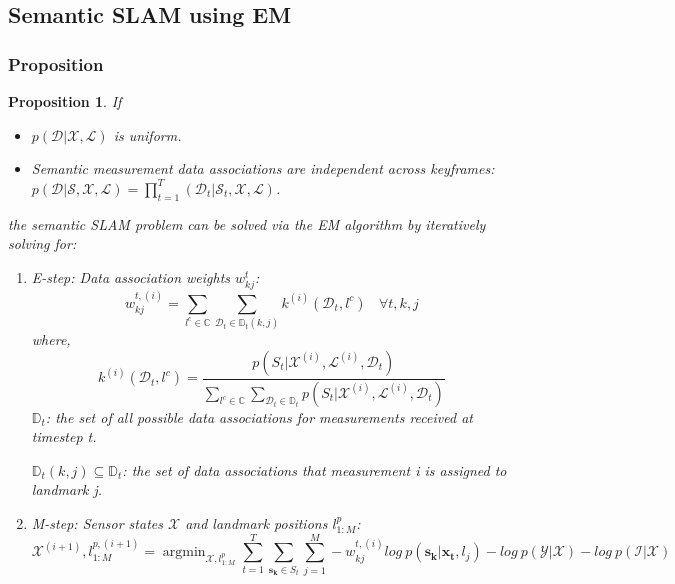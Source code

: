 \documentclass[12pt]{article}
\DeclareMathOperator*{\argmin}{argmin} %
\numberwithin{equation}{section}
\newtheorem{Proposition}{Proposition}
\begin{document}
\subsection{Semantic SLAM using EM}
\subsubsection{Proposition}
\begin{Proposition}
	If
	\begin{itemize}
		\item $p(\mathcal{D}|\mathcal{X},\mathcal{L})$ is uniform.
		\item Semantic measurement data associations are independent across keyframes: $p(\mathcal{D}|\mathcal{S},\mathcal{X},\mathcal{L})=\prod^T_{t=1}(\mathcal{D}_t|\mathcal{S}_t,\mathcal{X},\mathcal{L})$.
	\end{itemize}
	the semantic SLAM problem can be solved via the EM algorithm by iteratively solving for:
	\begin{enumerate}
		\item E-step: Data association weights $w^t_{kj}$:
		\begin{equation}
			w^{t,(i)}_{kj}=\sum_{l^c \in \mathbb{C}} \sum_{\mathcal{D}_t \in \mathbb{D}_t(k,j)} k^{(i)}(\mathcal{D}_t, l^c) \ \ \ \ \forall t, k, j
		\end{equation}
		where,
		\begin{equation}
			k^{(i)}(\mathcal{D}_t,l^c)=\frac{p(S_t|\mathcal{X}^{(i)},\mathcal{L}^{(i)}, \mathcal{D}_t)}{\sum_{l^c \in \mathbb{C}} \sum_{\mathcal{D}_t \in \mathbb{D}_t} p(S_t|\mathcal{X}^{(i)},\mathcal{L}^{(i)}, \mathcal{D}_t)}
		\end{equation}
		$\mathbb{D}_t$: the set of all possible data associations for measurements received at timestep t. \par
		$\mathbb{D}_t(k,j) \subseteq \mathbb{D}_t$: the set of data associations that measurement i is assigned to landmark j. 
		\item M-step: Sensor states $\mathcal{X}$ and landmark positions $l^p_{1:M}$:
		\begin{equation} \label{eq:mstep}
			\mathcal{X}^{(i+1)}, {l}^{p,(i+1)}_{1:M}=\argmin_{\mathcal{X}, l^p_{1:M}} \sum^T_{t=1} \sum_{\bm{s_k} \in S_t} \sum^M_{j=1} -w^{t,(i)}_{kj} log \ p(\bm{s_k}|\bm{x_t}, l_j) - log\ p(\mathcal{Y}|\mathcal{X}) - log\ p(\mathcal{I}|\mathcal{X})
		\end{equation}
	\end{enumerate}	
\end{Proposition} \par
\end{document}
